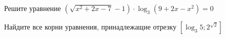 \begin{ex}
	\begin{condition}
		\begin{enumcols}[label=\asbuk*)]
			\item Решите уравнение \( \left(\sqrt{x^2 + 2x - 7  }-1\right)\cdot\log_3 \left(9+2x - x^2\right) = 0 \)
			\item Найдите все корни уравнения, принадлежащие отрезку \( \left[\log_3 5;2^{\sqrt{2}}\right] \)
		\end{enumcols}
	\end{condition}
\end{ex}